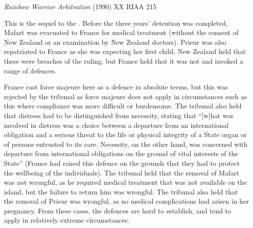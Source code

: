 \begin{casedetails}{\textit{Rainbow Warrior Arbitration} (1990) XX RIAA 215}
    \flushleft

    This is the sequel to the . Before the three years' detention was completed, Mafart was evacuated to France for medical treatment (without the consent of New Zealand or an examination by New Zealand doctors). Prieur was also repatriated to France as she was expecting her first child. New Zealand held that these were breaches of the ruling, but France held that it was not and invoked a range of defences.

    \vspace{\baselineskip}

    France cast force majeure here as a defence in absolute terms, but this was rejected by the tribunal as force majeure does not apply in circumstances such as this where compliance was more difficult or burdensome. The tribunal also held that distress had to be distinguished from necessity, stating that ``[w]hat was involved in distress was a choice between a departure from an international obligation and a serious threat to the life or physical integrity of a State organ or of persons entrusted to its care. Necessity, on the other hand, was concerned with departure from international obligations on the ground of vital interests of the State'' (France had raised this defence on the grounds that they had to protect the wellbeing of the individuals). The tribunal held that the removal of Mafart was not wrongful, as he required medical treatment that was not available on the island, but the failure to return him was wrongful. The tribunal also held that the removal of Prieur was wrongful, as no medical complications had arisen in her pregnancy. From these cases, the defences are hard to establish, and tend to apply in relatively extreme circumstances.
\end{casedetails}

